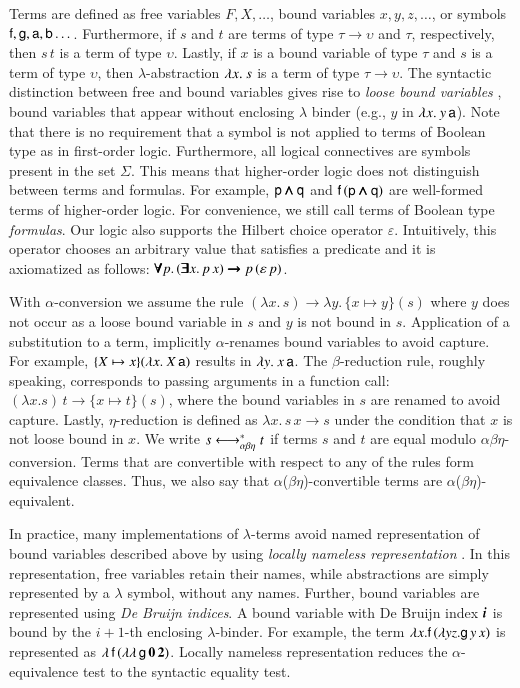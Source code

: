 Terms are defined as free variables $F, X, \ldots$, bound variables $x, y, z,
\dotsc$, or symbols $\mathsf{f}, \mathsf{g},\allowbreak \mathsf{a},\allowbreak \mathsf{b}
\dotsc$. Furthermore, if $s$ and $t$ are terms of type $\tau \rightarrow
\upsilon$ and $\tau$, respectively, then $s \, t$ is a term of type $\upsilon$.
Lastly, if $x$ is a bound variable of type $\tau$ and $s$ is a term of type
$\upsilon$, then $\lambda$-abstraction $\lambda x.\> s$ is a term of type $\tau
\rightarrow \upsilon$. The syntactic distinction between free and bound
variables gives rise to \emph{loose bound variables} \cite{tn-93-patterns},
bound variables that appear without enclosing $\lambda$ binder  (e.g., $y$ in
$\lambda x.\> y \, \mathsf{a}$). Note that there is no requirement that a
symbol is not applied to terms of Boolean type as in first-order logic.
Furthermore, all logical connectives are symbols present in the set $\Sigma$.
This means that higher-order logic does not distinguish between terms and
formulas. For example, $\mathsf{p} \pmb{\land} \mathsf{q}$ and $\mathsf{f} \, (\mathsf{p} \pmb{\land}
\mathsf{q})$ are well-formed terms of higher-order logic. For convenience, we still
call terms of Boolean type \emph{formulas}. Our logic also supports the Hilbert
choice operator $\varepsilon$. Intuitively, this operator chooses an arbitrary value that
satisfies a predicate and it is axiomatized as follows: $\pmb{\forall} p. \, (\pmb{\exists}
x. \, p \, x) \pmb{\rightarrow} p \, (\varepsilon \, p)$.


With $\alpha$-conversion we assume the rule $(\lambda x. \, s) \longrightarrow
\lambda y. \, \{x \mapsto y\}(s)$ where $y$ does not occur as a loose bound variable in $s$
and $y$ is not bound in $s$. Application of a substitution to a term,
implicitly $\alpha$-renames bound variables to avoid capture.  For example, $\{X
\mapsto x\}(\lambda x.\> X \, \mathsf{a})$ results in $\lambda y.\> x \, \mathsf{a}$. The
$\beta$-reduction rule, roughly speaking, corresponds to passing arguments in a
function call: $(\lambda x. s) \, t \longrightarrow \{x \mapsto t\} (s)$, where
the bound variables in $s$ are renamed to avoid capture. Lastly,
$\eta$-reduction is defined as $\lambda x.\, s \, x \longrightarrow s$ under the
condition that $x$ is not loose bound in $x$. We write $s \longleftrightarrow^*_{\alpha\beta\eta} t$ if terms
$s$ and $t$ are equal modulo $\alpha\beta\eta$-conversion. Terms that are
convertible with respect to any of the rules form equivalence classes. Thus, we
also say that $\alpha$($\beta\eta$)-convertible terms are
$\alpha$($\beta\eta$)-equivalent. 

In practice, many implementations of $\lambda$-terms avoid named representation
of bound variables described above by using \emph{locally nameless
representation} \cite{ac-12-locally-nameless}. In this representation, free
variables retain their names, while abstractions are simply represented by a
$\lambda$ symbol, without any names. Further, bound variables are represented
using \emph{De Bruijn indices}. A bound variable with De Bruijn index
$\textbf{\textit{i}}$ is bound by the $i+1$-th enclosing $\lambda$-binder. For example,
the term $\lambda x. \mathsf{f} \, (\lambda y z. \mathsf{g} \, y \, x)$ is represented
as $\lambda\, \mathsf{f} \, (\lambda \lambda\, \mathsf{g} \, \mathbf{0} \, \mathbf{2})$.
Locally nameless representation reduces the $\alpha$-equivalence test to 
the syntactic equality test. 

